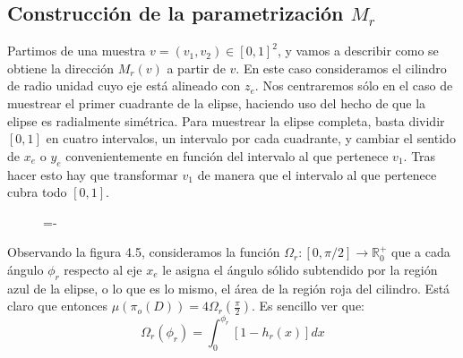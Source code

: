\subsection{Construcción de la parametrización $M_r$}
Partimos de una muestra $v=(v_1,v_2)\in[0,1]^2$, y vamos a describir como se obtiene la dirección $M_r(v)$ a partir de $v$. En este caso consideramos el cilindro de radio unidad cuyo eje está alineado con $z_e$. Nos centraremos sólo en el caso de muestrear el primer cuadrante de la elipse, haciendo uso del hecho de que la elipse es radialmente simétrica. Para muestrear la elipse completa, basta dividir $[0,1]$ en cuatro intervalos, un intervalo por cada cuadrante, y cambiar el sentido de $x_e$ o $y_e$ convenientemente en función del intervalo al que pertenece $v_1$. Tras hacer esto hay que transformar $v_1$ de manera que el intervalo al que pertenece cubra todo $[0,1]$.

\begin{figure}[h]
  \lineskip=-\fboxrule
\end{figure}

Observando la figura 4.5, consideramos la función $\Omega_r:[0,\pi /2]\rightarrow \mathds{R}_0^+$ que a cada ángulo $\phi_r$ respecto al eje $x_e$ le asigna el ángulo sólido subtendido por la región azul de la elipse, o lo que es lo mismo, el área de la región roja del cilindro. Está claro que entonces $\mu(\pi_o(D)) = 4\Omega_r(\frac{\pi}{2})$. Es sencillo ver que:
$$\Omega_r(\phi_r)=\int_0^{\phi_r}[1-h_r(x)] dx$$

